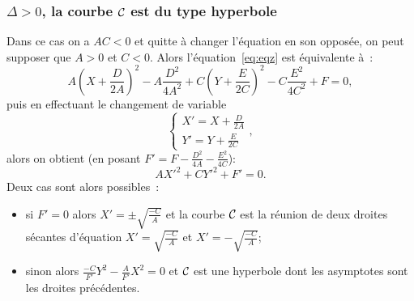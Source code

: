 \subsubsection{$\Delta>0$, la courbe $\mathcal{C}_{}$ est du type hyperbole}
Dans ce cas on a $AC<0$ et quitte à changer l'équation en son opposée, on peut supposer que $A>0$ et $C<0$. Alors l'équation~\eqref{eq:eqz} est équivalente à~:
\begin{equation}
  A\left(X+\frac{D}{2A}\right)^2 -A\frac{D^2}{4A^2} + C\left(Y+\frac{E}{2C}\right)^2 -C\frac{E^2}{4C^2}+F=0,
\end{equation}
puis en effectuant le changement de variable
\begin{equation}
  \begin{cases}
    X' = X+\frac{D}{2A} \\
    Y' = Y+\frac{E}{2C}
  \end{cases},
\end{equation}
alors on obtient (en posant $F'=F-\frac{D^2}{4A}-\frac{E^2}{4C}$):
\begin{equation}
  AX'^2+CY'^2+F'=0.
\end{equation}
Deux cas sont alors possibles~:
\begin{itemize}
\item si $F'=0$ alors $X'=\pm \sqrt{\frac{-C}{A}}$ et la courbe $\mathcal{C}_{}$ est la réunion de deux droites sécantes d'équation $X'=\sqrt{\frac{-C}{A}}$ et $X'=-\sqrt{\frac{-C}{A}}$;
\item sinon alors $\frac{-C}{F'}Y^2-\frac{A}{F'}X^2=0$ et $\mathcal{C}_{}$ est une hyperbole dont les asymptotes sont les droites précédentes.
\end{itemize}

